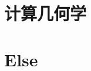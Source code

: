 \documentclass[UTF8]{../09-Mathematics}
\begin{document}
\chapter{计算几何学}





\chapter{Else}
\end{document}
